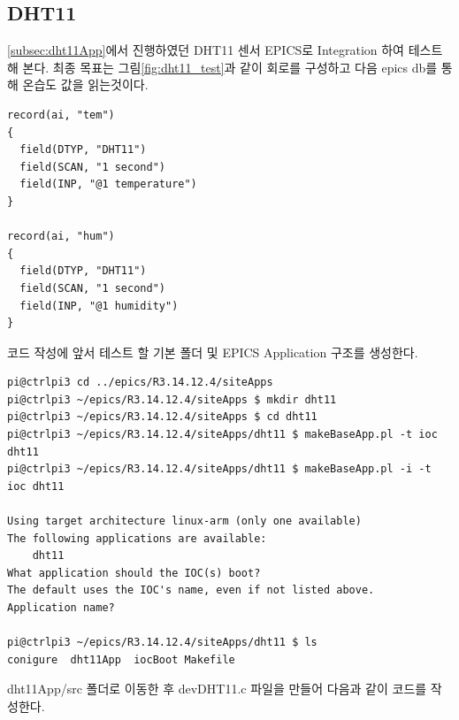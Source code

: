 \documentclass[11pt
  , a4paper
  , article
  , oneside
]{memoir}
\begin{document}
\subsection{DHT11}
\ref{subsec:dht11App}에서 진행하였던 DHT11 센서 EPICS로 Integration 하여 테스트해 본다. 최종
목표는 그림\ref{fig:dht11_test}과 같이 회로를 구성하고 다음 epics db를 통해 온습도 값을 읽는것이다.
\begin{lstlisting}[style=termstyle]
record(ai, "tem")
{
  field(DTYP, "DHT11")
  field(SCAN, "1 second")
  field(INP, "@1 temperature")
}

record(ai, "hum")
{
  field(DTYP, "DHT11")
  field(SCAN, "1 second")
  field(INP, "@1 humidity")
}
\end{lstlisting}
코드 작성에 앞서 테스트 할 기본 폴더 및 EPICS Application 구조를 생성한다.
\begin{lstlisting}[style=termstyle]
pi@ctrlpi3 cd ../epics/R3.14.12.4/siteApps
pi@ctrlpi3 ~/epics/R3.14.12.4/siteApps $ mkdir dht11
pi@ctrlpi3 ~/epics/R3.14.12.4/siteApps $ cd dht11
pi@ctrlpi3 ~/epics/R3.14.12.4/siteApps/dht11 $ makeBaseApp.pl -t ioc dht11
pi@ctrlpi3 ~/epics/R3.14.12.4/siteApps/dht11 $ makeBaseApp.pl -i -t ioc dht11

Using target architecture linux-arm (only one available)
The following applications are available:
    dht11
What application should the IOC(s) boot?
The default uses the IOC's name, even if not listed above.
Application name?

pi@ctrlpi3 ~/epics/R3.14.12.4/siteApps/dht11 $ ls
conigure  dht11App  iocBoot Makefile
\end{lstlisting}
dht11App/src 폴더로 이동한 후 devDHT11.c 파일을 만들어 다음과 같이 코드를 작성한다.
\end{document}

